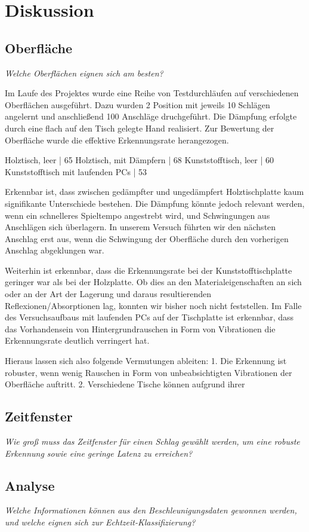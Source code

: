 \section{Diskussion}
\subsection{Oberfläche}
\textit{Welche Oberflächen eignen sich am besten?}

Im Laufe des Projektes wurde eine Reihe von Testdurchläufen auf verschiedenen Oberflächen ausgeführt. Dazu wurden 2 Position mit jeweils 10 Schlägen angelernt und anschließend 100 Anschläge druchgeführt. Die Dämpfung erfolgte durch eine flach auf den Tisch gelegte Hand realisiert. Zur Bewertung der Oberfläche wurde die effektive Erkennungsrate herangezogen.

Holztisch, leer | 65%
Holztisch, mit Dämpfern | 68%
Kunststofftisch, leer | 60%
Kunststofftisch mit laufenden PCs | 53%

Erkennbar ist, dass zwischen gedämpfter und ungedämpfert Holztischplatte kaum signifikante Unterschiede bestehen. Die Dämpfung könnte jedoch relevant werden, wenn ein schnelleres Spieltempo angestrebt wird, und Schwingungen aus Anschlägen sich überlagern. In unserem Versuch führten wir den nächsten Anschlag erst aus, wenn die Schwingung der Oberfläche durch den vorherigen Anschlag abgeklungen war.

Weiterhin ist erkennbar, dass die Erkennungsrate bei der Kunststofftischplatte geringer war als bei der Holzplatte. 
Ob dies an den Materialeigenschaften an sich oder an der Art der Lagerung und daraus resultierenden Reflexionen/Absorptionen lag, konnten wir bisher noch nicht feststellen.
Im Falle des Versuchsaufbaus mit laufenden PCs auf der Tischplatte ist erkennbar, dass das Vorhandensein von Hintergrundrauschen in Form von Vibrationen die Erkennungsrate deutlich verringert hat.

Hieraus lassen sich also folgende Vermutungen ableiten:
1. Die Erkennung ist robuster, wenn wenig Rauschen in Form von unbeabsichtigten Vibrationen der Oberfläche auftritt.
2. Verschiedene Tische können aufgrund ihrer 


\subsection{Zeitfenster}
\textit{Wie groß muss das Zeitfenster für einen Schlag gewählt werden, um eine robuste Erkennung sowie eine geringe Latenz zu erreichen?}



\subsection{Analyse}
\textit{Welche Informationen können aus den Beschleunigungsdaten gewonnen werden, und welche eignen sich zur Echtzeit-Klassifizierung?}


